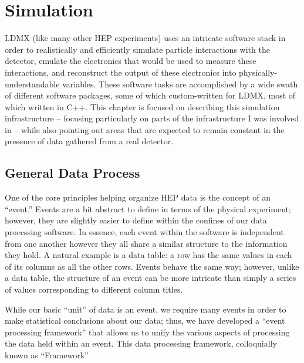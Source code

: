 \chapter{Simulation}
\label{chapter:ldmx:simulation}


LDMX (like many other HEP experiments) uses an intricate software stack in order to realistically and efficiently simulate particle interactions with the detector, emulate the electronics that would be used to measure these interactions, and reconstruct the output of these electronics into physically-understandable variables.
These software tasks are accomplished by a wide swath of different software packages, some of which custom-written for LDMX, most of which written in C++.
This chapter is focused on describing this simulation infrastructure -- focusing particularly on parts of the infrastructure I was involved in -- while also pointing out areas that are expected to remain constant in the presence of data gathered from a real detector.

\section{General Data Process}
One of the core principles helping organize HEP data is the concept of an ``event.''
Events are a bit abstract to define in terms of the physical experiment; however, they are slightly easier to define within the confines of our data processing software.
In essence, each event within the software is independent from one another however they all share a similar structure to the information they hold. A natural example is a data table: a row has the same values in each of its columns as all the other rows. Events behave the same way; however, unlike a data table, the structure of an event can be more intricate than simply a series of values corresponding to different column titles.

While our basic ``unit'' of data is an event, we require many events in order to make statistical conclusions about our data; thus, we have developed a ``event processing framework'' that allows us to unify the various aspects of processing the data held within an event. This data processing framework, colloquially known as ``Framework''

